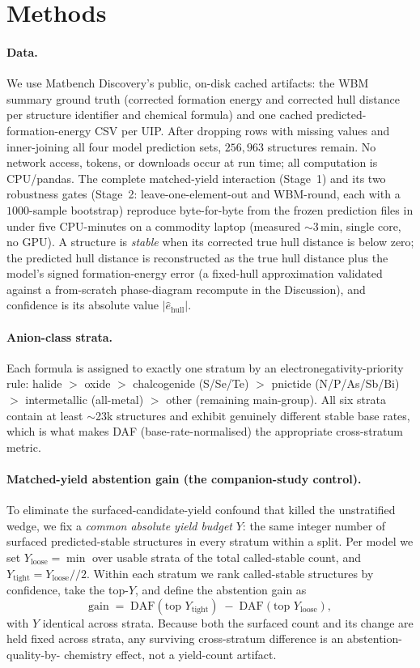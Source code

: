 \documentclass[11pt]{article}
\begin{document}
\section{Methods}

\paragraph{Data.} We use Matbench Discovery's public, on-disk cached artifacts: the
WBM summary ground truth (corrected formation energy and corrected hull distance per
structure identifier and chemical formula) and one cached predicted-formation-energy CSV per
UIP. After dropping rows with missing values and inner-joining all four model prediction sets,
$256{,}963$ structures remain. No network access, tokens, or downloads occur at run time;
all computation is CPU/pandas. The complete matched-yield interaction (Stage~1) and its two
robustness gates (Stage~2: leave-one-element-out and WBM-round, each with a $1000$-sample
bootstrap) reproduce byte-for-byte from the frozen prediction files in under five CPU-minutes
on a commodity laptop (measured $\sim$3\,min, single core, no GPU). A structure is \emph{stable}
when its corrected true hull
distance is below zero; the predicted hull distance is reconstructed as the true hull
distance plus the model's signed formation-energy error (a fixed-hull approximation validated
against a from-scratch phase-diagram recompute in the Discussion), and confidence is its absolute
value $|\hat{e}_{\mathrm{hull}}|$.

\paragraph{Anion-class strata.} Each formula is assigned to exactly one stratum by an
electronegativity-priority rule: halide $>$ oxide $>$ chalcogenide (S/Se/Te) $>$ pnictide
(N/P/As/Sb/Bi) $>$ intermetallic (all-metal) $>$ other (remaining main-group). All six strata
contain at least $\sim$23k structures and exhibit genuinely different stable base rates,
which is what makes DAF (base-rate-normalised) the appropriate cross-stratum metric.

\paragraph{Matched-yield abstention gain (the companion-study control).} To eliminate the
surfaced-candidate-yield confound that killed the unstratified wedge, we fix a \emph{common
absolute yield budget} $Y$: the same integer number of surfaced predicted-stable structures
in every stratum within a split. Per model we set $Y_{\mathrm{loose}} = \min$ over usable
strata of the total called-stable count, and $Y_{\mathrm{tight}} = Y_{\mathrm{loose}} // 2$.
Within each stratum we rank called-stable structures by confidence, take the top-$Y$, and
define the abstention gain as
\[
  \mathrm{gain} \;=\; \mathrm{DAF}(\text{top } Y_{\mathrm{tight}})
                    \;-\; \mathrm{DAF}(\text{top } Y_{\mathrm{loose}}),
\]
with $Y$ identical across strata. Because both the surfaced count and its change are held
fixed across strata, any surviving cross-stratum difference is an abstention-quality-by-
chemistry effect, not a yield-count artifact.
\end{document}
